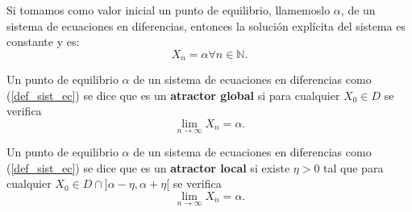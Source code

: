 \begin{proposition}
Si tomamos como valor inicial un punto de equilibrio, llamemoslo $\alpha$, de un sistema de ecuaciones en diferencias, entonces la solución explícita del sistema es constante y es:
$$X_n = \alpha \forall n\in\mathbb{N}.$$
\end{proposition}

\begin{definition}
Un punto de equilibrio $\alpha$ de un sistema de ecuaciones en diferencias como (\ref{def_sist_ec}) se dice que es un \textbf{atractor global} si para cualquier $X_0\in D$ se verifica
$$\displaystyle\lim_{n\to \infty} X_n = \alpha.$$
\end{definition}

\begin{definition}
Un punto de equilibrio $\alpha$ de un sistema de ecuaciones en diferencias como (\ref{def_sist_ec}) se dice que es un \textbf{atractor local} si existe $\eta>0$ tal que para cualquier $X_0\in D\cap \text{]}\alpha -\eta , \alpha + \eta \text{[}$ se verifica
$$\displaystyle\lim_{n\to \infty} X_n = \alpha.$$

\end{definition}